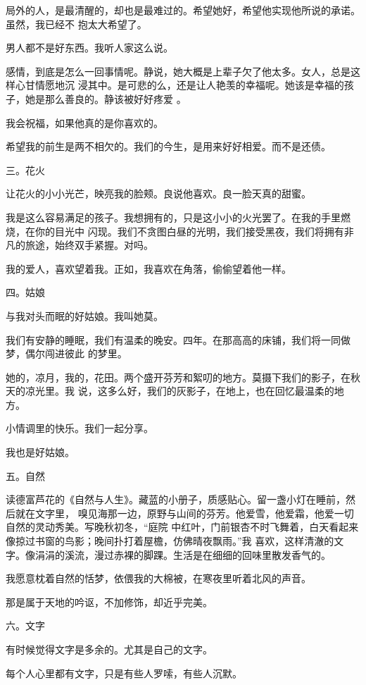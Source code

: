 \documentclass[12pt,a4paper]{article}
\newcommand{\subpart}[1]{
	\begingroup \par
	\vspace{1ex} \centering #1
	\par \endgroup
}
\begin{document}
		局外的人，是最清醒的，却也是最难过的。希望她好，希望他实现他所说的承诺。虽然，我已经不
	抱太大希望了。

		男人都不是好东西。我听人家这么说。

		感情，到底是怎么一回事情呢。静说，她大概是上辈子欠了他太多。女人，总是这样心甘情愿地沉
	浸其中。是可悲的么，还是让人艳羡的幸福呢。她该是幸福的孩子，她是那么善良的。静该被好好疼爱
	。

		我会祝福，如果他真的是你喜欢的。

		希望我的前生是两不相欠的。我们的今生，是用来好好相爱。而不是还债。

		\subpart{三。花火}

		让花火的小小光芒，映亮我的脸颊。良说他喜欢。良一脸天真的甜蜜。

		我是这么容易满足的孩子。我想拥有的，只是这小小的火光罢了。在我的手里燃烧，在你的目光中
	闪现。我们不贪图白昼的光明，我们接受黑夜，我们将拥有非凡的旅途，始终双手紧握。对吗。

		我的爱人，喜欢望着我。正如，我喜欢在角落，偷偷望着他一样。

		\subpart{四。姑娘}

		与我对头而眠的好姑娘。我叫她莫。

		我们有安静的睡眠，我们有温柔的晚安。四年。在那高高的床铺，我们将一同做梦，偶尔闯进彼此
	的梦里。

		她的，凉月，我的，花田。两个盛开芬芳和絮叨的地方。莫摄下我们的影子，在秋天的凉光里。我
	说，这多么好，我们的灰影子，在地上，也在回忆最温柔的地方。

		小情调里的快乐。我们一起分享。

		我也是好姑娘。

		\subpart{五。自然}

		读德富芦花的《自然与人生》。藏蓝的小册子，质感贴心。留一盏小灯在睡前，然后就在文字里，
	嗅见海那一边，原野与山间的芬芳。他爱雪，他爱霜，他爱一切自然的灵动秀美。写晚秋初冬，“庭院
	中红叶，门前银杏不时飞舞着，白天看起来像掠过书窗的鸟影；晚间扑打着屋檐，仿佛晴夜飘雨。”我
	喜欢，这样清澈的文字。像涓涓的溪流，漫过赤裸的脚踝。生活是在细细的回味里散发香气的。

		我愿意枕着自然的恬梦，依偎我的大棉被，在寒夜里听着北风的声音。

		那是属于天地的吟讴，不加修饰，却近乎完美。

		\subpart{六。文字}

		有时候觉得文字是多余的。尤其是自己的文字。

		每个人心里都有文字，只是有些人罗嗦，有些人沉默。
\end{document}
